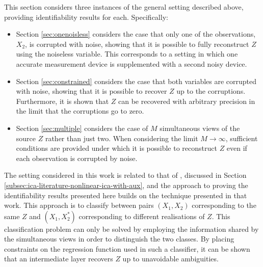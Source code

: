 This section considers three instances of the general setting described above, providing identifiability results for each.
Specifically:
%
\begin{itemize}
	\item Section \ref{sec:onenoisless} considers the case that only one of the observations, $X_2$, is corrupted with noise, showing that it is possible to fully reconstruct $Z$ using the noiseless variable. 
	This corresponds to a setting in which one accurate measurement device is supplemented with a second noisy device. 
	\item Section \ref{sec:constrained} considers the case that both variables are corrupted with noise, showing that it is possible to recover $Z$ up to the corruptions. 
	Furthermore, it is shown that $Z$ can be recovered with arbitrary precision in the limit that the corruptions go to zero.
	\item Section \ref{sec:multiple} considers the case of $M$ simultaneous views of the source $Z$ rather than just two.
	When considering the limit $M \rightarrow \infty$, sufficient conditions are provided under which it is possible to reconstruct $Z$ even if each observation is corrupted by noise.
\end{itemize}
%



The setting considered in this work is related to that of \cite{hyvarinen19a}, discussed in Section \ref{subsec:ica-literature-nonlinear-ica-with-aux},
and the approach to proving the identifiability results presented here builds on the technique presented in that work.
This approach 
is to classify between pairs $(X_1, X_2)$ corresponding to the same $Z$ and $(X_1, X^*_2)$ corresponding to different realisations of $Z$.
This classification problem can only be solved by employing the information shared by the simultaneous views in order to distinguish the two classes.
By placing constraints on the regression function used in such a classifier, it can be shown that an intermediate layer recovers $Z$ up to unavoidable ambiguities.


